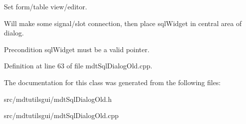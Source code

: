 Set form/table view/editor. 

Will make some signal/slot connection, then place sqlWidget in central area of dialog.

\begin{DoxyPrecond}{Precondition}
sqlWidget must be a valid pointer. 
\end{DoxyPrecond}


Definition at line 63 of file mdtSqlDialogOld.cpp.



The documentation for this class was generated from the following files:\begin{DoxyCompactItemize}
\item 
src/mdtutilsgui/mdtSqlDialogOld.h\item 
src/mdtutilsgui/mdtSqlDialogOld.cpp\end{DoxyCompactItemize}

